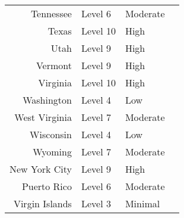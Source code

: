 \documentclass[11pt]{article}
\begin{document}
\begin{tabular}{r|lll}
	 Tennessee      & Level 6        & Moderate      \\
	 Texas          & Level 10       & High          \\
	 Utah           & Level 9        & High          \\
	 Vermont        & Level 9        & High          \\
	 Virginia       & Level 10       & High          \\
	 Washington     & Level 4        & Low           \\
	 West Virginia  & Level 7        & Moderate      \\
	 Wisconsin      & Level 4        & Low           \\
	 Wyoming        & Level 7        & Moderate      \\
	 New York City  & Level 9        & High          \\
	 Puerto Rico    & Level 6        & Moderate      \\
	 Virgin Islands & Level 3        & Minimal       \\
\end{tabular}
\end{document}
